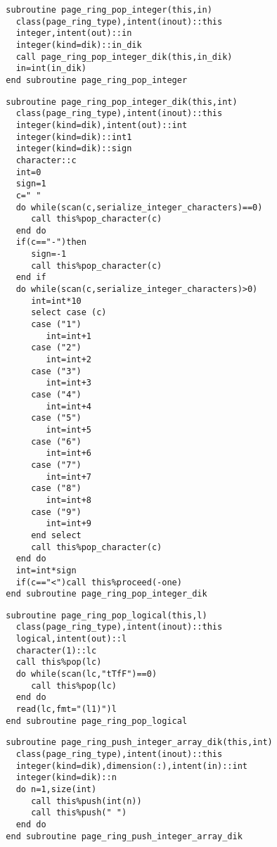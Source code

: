 \begin{Verbatim}
  subroutine page_ring_pop_integer(this,in)
    class(page_ring_type),intent(inout)::this
    integer,intent(out)::in
    integer(kind=dik)::in_dik
    call page_ring_pop_integer_dik(this,in_dik)
    in=int(in_dik)
  end subroutine page_ring_pop_integer
\end{Verbatim}

\begin{Verbatim}
  subroutine page_ring_pop_integer_dik(this,int)
    class(page_ring_type),intent(inout)::this
    integer(kind=dik),intent(out)::int
    integer(kind=dik)::int1
    integer(kind=dik)::sign
    character::c
    int=0
    sign=1
    c=" "
    do while(scan(c,serialize_integer_characters)==0)
       call this%pop_character(c)
    end do
    if(c=="-")then
       sign=-1
       call this%pop_character(c)
    end if
    do while(scan(c,serialize_integer_characters)>0)
       int=int*10
       select case (c)
       case ("1")
          int=int+1
       case ("2")
          int=int+2
       case ("3")
          int=int+3
       case ("4")
          int=int+4
       case ("5")
          int=int+5
       case ("6")
          int=int+6
       case ("7")
          int=int+7
       case ("8")
          int=int+8
       case ("9")
          int=int+9
       end select
       call this%pop_character(c)
    end do
    int=int*sign
    if(c=="<")call this%proceed(-one)
  end subroutine page_ring_pop_integer_dik
\end{Verbatim}

\begin{Verbatim}
  subroutine page_ring_pop_logical(this,l)
    class(page_ring_type),intent(inout)::this
    logical,intent(out)::l
    character(1)::lc
    call this%pop(lc)
    do while(scan(lc,"tTfF")==0)
       call this%pop(lc)
    end do
    read(lc,fmt="(l1)")l
  end subroutine page_ring_pop_logical
\end{Verbatim}

\begin{Verbatim}
  subroutine page_ring_push_integer_array_dik(this,int)
    class(page_ring_type),intent(inout)::this
    integer(kind=dik),dimension(:),intent(in)::int
    integer(kind=dik)::n
    do n=1,size(int)
       call this%push(int(n))
       call this%push(" ")
    end do
  end subroutine page_ring_push_integer_array_dik
\end{Verbatim}
  
